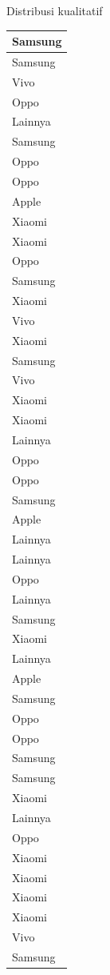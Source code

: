 \documentclass[
  ignorenonframetext,
]{beamer}
\begin{document}
\begin{frame}[s]{Distribusi kualitatif}
\begin{table}
\begin{tabular}[t]{l}
\hline
Samsung\\
\hline
Samsung\\
\hline
Vivo\\
\hline
Oppo\\
\hline
Lainnya\\
\hline
Samsung\\
\hline
Oppo\\
\hline
Oppo\\
\hline
Apple\\
\hline
Xiaomi\\
\hline
Xiaomi\\
\hline
Oppo\\
\hline
Samsung\\
\hline
Xiaomi\\
\hline
Vivo\\
\hline
Xiaomi\\
\hline
Samsung\\
\hline
Vivo\\
\hline
Xiaomi\\
\hline
Xiaomi\\
\hline
Lainnya\\
\hline
Oppo\\
\hline
Oppo\\
\hline
Samsung\\
\hline
Apple\\
\hline
Lainnya\\
\hline
Lainnya\\
\hline
Oppo\\
\hline
Lainnya\\
\hline
Samsung\\
\hline
Xiaomi\\
\hline
Lainnya\\
\hline
Apple\\
\hline
Samsung\\
\hline
Oppo\\
\hline
Oppo\\
\hline
Samsung\\
\hline
Samsung\\
\hline
Xiaomi\\
\hline
Lainnya\\
\hline
Oppo\\
\hline
Xiaomi\\
\hline
Xiaomi\\
\hline
Xiaomi\\
\hline
Xiaomi\\
\hline
Vivo\\
\hline
Samsung\\

\end{tabular}
\end{table}
\end{frame}
\end{document}
